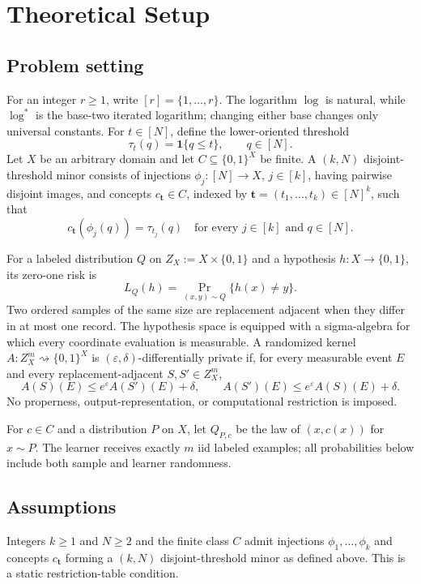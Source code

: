 \section{Theoretical Setup}
\label{sec:setup}

\subsection{Problem setting}

For an integer $r\geq 1$, write $[r]=\{1,\ldots,r\}$.  The logarithm
$\log$ is natural, while $\log^*$ is the base-two iterated logarithm;
changing either base changes only universal constants.  For $t\in[N]$,
define the lower-oriented threshold
\[
\tau_t(q)=\mathbf 1\{q\leq t\},\qquad q\in[N].
\]
Let $X$ be an arbitrary domain and let $C\subseteq\{0,1\}^X$ be finite.
A $(k,N)$ disjoint-threshold minor consists of injections
$\phi_j:[N]\to X$, $j\in[k]$, having pairwise disjoint images, and
concepts $c_{\mathbf t}\in C$, indexed by
$\mathbf t=(t_1,\ldots,t_k)\in[N]^k$, such that
\[
c_{\mathbf t}(\phi_j(q))=\tau_{t_j}(q)
\quad\text{for every }j\in[k]\text{ and }q\in[N].
\]

For a labeled distribution $Q$ on $Z_X:=X\times\{0,1\}$ and a hypothesis
$h:X\to\{0,1\}$, its zero-one risk is
\[
L_Q(h)=\Pr_{(x,y)\sim Q}\{h(x)\neq y\}.
\]
Two ordered samples of the same size are replacement adjacent when they
differ in at most one record.  The hypothesis space is equipped with a
sigma-algebra for which every coordinate evaluation is measurable.  A
randomized kernel $A:Z_X^m\rightsquigarrow\{0,1\}^X$ is
$(\varepsilon,\delta)$-differentially private if, for every measurable
event $E$ and every replacement-adjacent $S,S'\in Z_X^m$,
\[
A(S)(E)\leq e^\varepsilon A(S')(E)+\delta,
\qquad
A(S')(E)\leq e^\varepsilon A(S)(E)+\delta.
\]
No properness, output-representation, or computational restriction is
imposed.

For $c\in C$ and a distribution $P$ on $X$, let $Q_{P,c}$ be the law of
$(x,c(x))$ for $x\sim P$.  The learner receives exactly $m$ iid labeled
examples; all probabilities below include both sample and learner
randomness.

\subsection{Assumptions}

\begin{assumption}
\label{assump:minor-table}
Integers $k\geq1$ and $N\geq2$ and the finite class $C$ admit injections
$\phi_1,\ldots,\phi_k$ and concepts $c_{\mathbf t}$ forming a $(k,N)$
disjoint-threshold minor as defined above.  This is a static restriction-table
condition.
\end{assumption}

